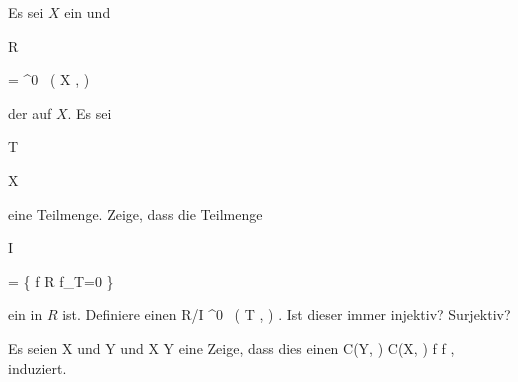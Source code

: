 {


Es sei $X$ ein
und


\mavergleichskette

{\vergleichskette

{ R
}

{ = }{ ^0 \, ( X , \R)
}

{  }{
}

{    }{
}

{   }{
}

}
{}{}{}
der
auf $X$. Es sei


\mavergleichskette

{\vergleichskette

{ T
}

{ \subseteq }{ X
}

{  }{
}

{    }{
}

{   }{
}

}
{}{}{}
eine Teilmenge. Zeige, dass die Teilmenge


\mavergleichskettedisp

{\vergleichskette

{ I
}

{ =} { \left\{ f \in R  \mid  f\vert_T=0        \right\}
}

{ } {
}

{ } {
}

{ } {
}

}
{}{}{}
ein
in $R$ ist. Definiere einen
\maabbdisp {} { R/I } { ^0 \, ( T , \R)
} {.}
Ist dieser immer injektiv? Surjektiv?


}

{} {}



{}

{


Es seien
\mathkor {} {X} {und} {Y} {}
 und
\maabbdisp {\varphi} { X } { Y
} {}
eine
Zeige, dass dies einen
\maabbeledisp {} { C(Y, \R)} {C(X, \R)
} { f } { f\circ \varphi
} {,}
induziert.


}

{} {}



{}

